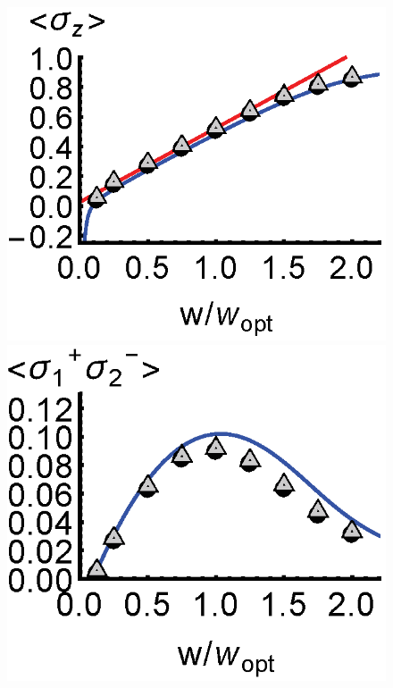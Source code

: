 \documentclass[aps,prl,twocolumn,
superscriptaddress,groupedaddress]{revtex4}
\begin{document}
\begin{figure}
\begin{center}
	\includegraphics[scale =0.38] {N40SuperradianceSZ.eps}
	\hspace{-5.0mm} \includegraphics[scale =0.38] {N40SuperradianceSPSM.eps}

\end{center}
\end{figure}
\end{document}
